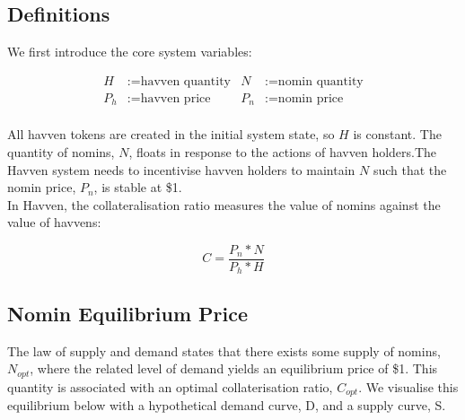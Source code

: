 \newpage

\subsection{Definitions}

\noindent We first introduce the core system variables:

\begin{align*}
H &:= \text{havven quantity} & N &:= \text{nomin quantity} \\
P_h &:= \text{havven price}  & P_n &:= \text{nomin price} \\
\end{align*}


\noindent All havven tokens are created in the initial system state, so $H$ is constant. The quantity of nomins, $N$, floats in response to the actions of havven holders.The Havven system needs to incentivise havven holders to maintain $N$ such that the nomin price, $P_n$, is stable at \$1.\\

\noindent In Havven, the collateralisation ratio measures the value of nomins against the value of havvens:

\begin{equation}
C = \frac{P_n * N}{P_h * H} \label{eq:collateralisation}
\end{equation}

\subsection{Nomin Equilibrium Price} The law of supply and demand states that there exists some supply of nomins, $N_{opt}$, where the related level of demand yields an equilibrium price of \$1. This quantity is associated with an optimal collaterisation ratio, $C_{opt}$. We visualise this equilibrium below with a hypothetical demand curve, D, and a supply curve, S.  \\

\begin{center}
\end{center}

